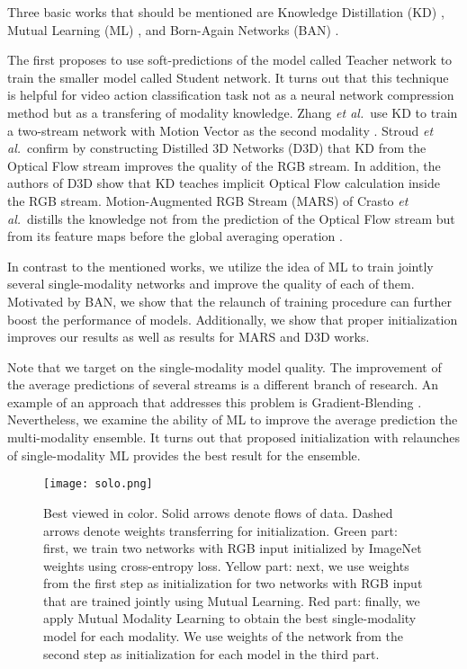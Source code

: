 \documentclass[conference]{IEEEtran}
\begin{document}
Three basic works that should be mentioned are Knowledge Distillation (KD) \cite{hinton2015distilling}, Mutual Learning (ML) \cite{zhang2018deep}, and Born-Again Networks (BAN) \cite{furlanello2018born}.

The first proposes to use soft-predictions of the model called Teacher network to train the smaller model called Student network. It turns out that this technique is helpful for video action classification task not as a neural network compression method but as a transfering of modality knowledge. Zhang \textit{et al.}~use KD to train a two-stream network with Motion Vector as the second modality \cite{zhang2016real}. Stroud \textit{et al.}~confirm by constructing Distilled 3D Networks (D3D) \cite{Stroud_2020_WACV} that KD from the Optical Flow stream improves the quality of the RGB stream. In addition, the authors of D3D show that KD teaches implicit Optical Flow calculation inside the RGB stream. Motion-Augmented RGB Stream (MARS) of Crasto \textit{et al.}~distills the knowledge not from the prediction of the Optical Flow stream but from its feature maps before the global averaging operation \cite{Crasto_2019_CVPR}.

In contrast to the mentioned works, we utilize the idea of ML to train jointly several single-modality networks and improve the quality of each of them. Motivated by BAN, we show that the relaunch of training procedure can further boost the performance of models. Additionally, we show that proper initialization improves our results as well as results for MARS and D3D works.

Note that we target on the single-modality model quality. The improvement of the average predictions of several streams is a different branch of research. An example of an approach that addresses this problem is Gradient-Blending \cite{wang2019makes}. Nevertheless, we examine the ability of ML to improve the average prediction the multi-modality ensemble. It turns out that proposed initialization with relaunches of single-modality ML provides the best result for the ensemble.

\begin{figure*}[!t]
	\centering
	\texttt{[image: solo.png]}
	\caption{Best viewed in color. Solid arrows denote flows of data. Dashed arrows denote weights transferring for initialization.
		Green part: first, we train two networks with RGB input initialized by ImageNet weights using cross-entropy loss.
		Yellow part: next, we use weights from the first step as initialization for two networks with RGB input that are trained jointly using Mutual Learning.
		Red part: finally, we apply Mutual Modality Learning to obtain the best single-modality model for each modality. We use weights of the network from the second step as initialization for each model in the third part.}
	\label{fig:solo}
\end{figure*}
\end{document}

